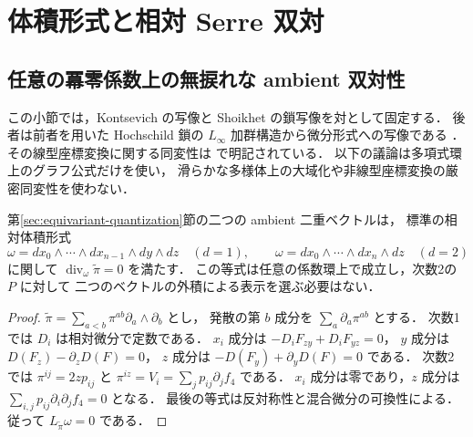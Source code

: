 \section{体積形式と相対 Serre 双対}
\label{sec:relative-serre-artin}

\subsection{任意の冪零係数上の無捩れな ambient 双対性}

この小節では，Kontsevich の写像と Shoikhet の鎖写像を対として固定する．
後者は前者を用いた Hochschild 鎖の $L_\infty$ 加群構造から微分形式への写像である
\cite[Theorem~2.2.7, \S2.2.8, \S3.2--3.3]{Shoikhet2003}．
その線型座標変換に関する同変性は
\cite[Theorem~3]{DolgushevChains2006}で明記されている．
以下の議論は多項式環上のグラフ公式だけを使い，
滑らかな多様体上の大域化や非線型座標変換の厳密同変性を使わない．

\begin{lemma}
\label{lem:ambient-unimodular-all-artin}
第\ref{sec:equivariant-quantization}節の二つの ambient 二重ベクトルは，
標準の相対体積形式
\[
 \omega=dx_0\wedge\cdots\wedge dx_{n-1}\wedge dy\wedge dz
 \quad(d=1),\qquad
 \omega=dx_0\wedge\cdots\wedge dx_n\wedge dz
 \quad(d=2)
\]
に関して $\operatorname{div}_\omega\widetilde\pi=0$ を満たす．
この等式は任意の係数環上で成立し，次数2の $P$ に対して
二つのベクトルの外積による表示を選ぶ必要はない．
\end{lemma}
\begin{proof}
$\widetilde\pi=\sum_{a<b}\pi^{ab}\partial_a\wedge\partial_b$ とし，
発散の第 $b$ 成分を $\sum_a\partial_a\pi^{ab}$ とする．
次数1では $D_i$ は相対微分で定数である．
$x_i$ 成分は $-D_iF_{zy}+D_iF_{yz}=0$，
$y$ 成分は $D(F_z)-\partial_zD(F)=0$，
$z$ 成分は $-D(F_y)+\partial_yD(F)=0$ である．
次数2では $\pi^{ij}=2zp_{ij}$ と
$\pi^{iz}=V_i=\sum_jp_{ij}\partial_jf_4$ である．
$x_i$ 成分は零であり，$z$ 成分は
$\sum_{i,j}p_{ij}\partial_i\partial_jf_4=0$ となる．
最後の等式は反対称性と混合微分の可換性による．
従って $L_{\widetilde\pi}\omega=0$ である．
\end{proof}

